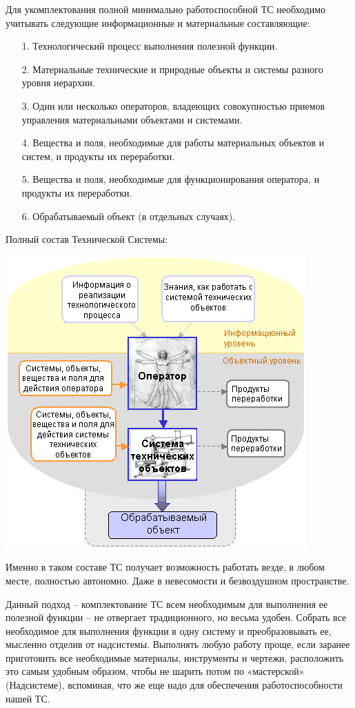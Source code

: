 \documentclass[11pt,a4paper]{article}
\begin{document}
Для укомплектования полной минимально работоспособной ТС необходимо учитывать
следующие информационные и материальные составляющие:
\begin{itemize}
\item[1.] Технологический процесс выполнения полезной функции.
\item[2.] Материальные технические и природные объекты и системы разного
  уровня иерархии.
\item[3.] Один или несколько операторов, владеющих совокупностью приемов
  управления материальными объектами и системами.
\item[4.] Вещества и поля, необходимые для работы материальных объектов и
  систем, и продукты их переработки.
\item[5.] Вещества и поля, необходимые для функционирования оператора, и
  продукты их переработки.
\item[6.] Обрабатываемый объект (в отдельных случаях).
\end{itemize}
Полный состав Технической Системы:
\begin{center}
  \includegraphics[width=.8\textwidth]{mts-3.png}
\end{center}
Именно в таком составе ТС получает возможность работать везде, в любом месте,
полностью автономно. Даже в невесомости и безвоздушном пространстве.

Данный подход – комплектование ТС всем необходимым для выполнения ее полезной
функции – не отвергает традиционного, но весьма удобен. Собрать все
необходимое для выполнения функции в одну систему и преобразовывать ее,
мысленно отделив от надсистемы. Выполнять любую работу проще, если заранее
приготовить все необходимые материалы, инструменты и чертежи, расположить это
самым удобным образом, чтобы не шарить потом по «мастерской» (Надсистеме),
вспоминая, что же еще надо для обеспечения работоспособности нашей ТС.
\end{document}

